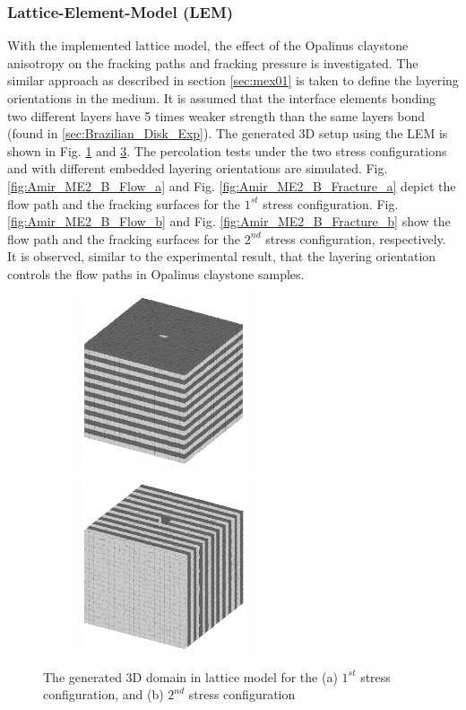 \subsubsection*{Lattice-Element-Model (LEM)}

With the implemented lattice model, the effect of the Opalinus claystone anisotropy on the fracking paths and fracking pressure is investigated. The similar approach as described in section \ref {sec:mex01} is taken to define the layering orientations in the medium. It is assumed that the interface elements bonding two different layers have 5 times weaker strength than the same layers bond (found in \ref{sec:Brazilian_Disk_Exp}). The generated 3D setup using the LEM is shown in Fig. \ref{fig:Amir_Percolation_Setup_a} and \ref{fig:Amir_Percolation_Setup_b}. The percolation tests under the two stress configurations and with different embedded layering orientations are simulated. Fig. \ref{fig:Amir_ME2_B_Flow_a} and Fig. \ref{fig:Amir_ME2_B_Fracture_a} depict the flow path and the fracking surfaces for the $1^{st}$ stress configuration. Fig. \ref{fig:Amir_ME2_B_Flow_b} and Fig. \ref{fig:Amir_ME2_B_Fracture_b} show the flow path and the fracking surfaces for the $2^{nd}$ stress configuration, respectively. It is observed, similar to the experimental result, that the layering orientation controls the flow paths in Opalinus claystone samples. 


\begin{figure}[!ht]
\begin{subfigure}[c]{0.48\textwidth}
\centering
\includegraphics[width=5cm,height=5cm]{figures/Amir_Percolation_Setup_a.png}
\subcaption{}
\label{fig:Amir_Percolation_Setup_a}
\end{subfigure}
\hfill
\begin{subfigure}[c]{0.48\textwidth}
\centering
\includegraphics[width=5cm,height=5cm]{figures/Amir_Percolation_Setup_b.png}
\subcaption{}
\label{fig:Amir_Percolation_Setup_b}
\end{subfigure}
\caption{The generated 3D domain in lattice model for the (a) $1^{st}$ stress configuration, and (b) $2^{nd}$ stress configuration}
\end{figure}

